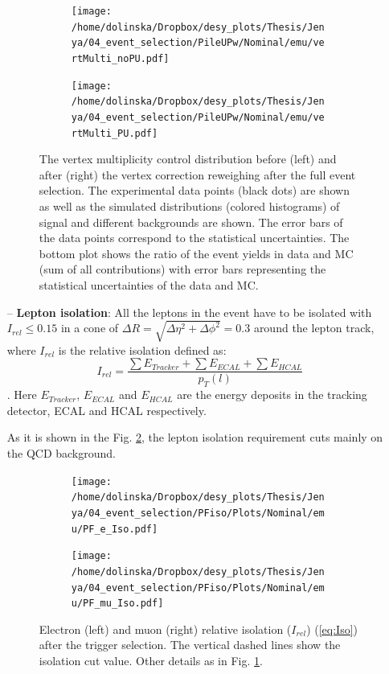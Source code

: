 \begin{itemize}
 \begin{figure}[h]
 \centering
 \begin{subfigure}
   \centering
   \texttt{[image: /home/dolinska/Dropbox/desy\_plots/Thesis/Jenya/04\_event\_selection/PileUPw/Nominal/emu/vertMulti\_noPU.pdf]}
 \end{subfigure}
 \begin{subfigure}
   \centering
   \texttt{[image: /home/dolinska/Dropbox/desy\_plots/Thesis/Jenya/04\_event\_selection/PileUPw/Nominal/emu/vertMulti\_PU.pdf]}
 \end{subfigure}
 \caption{The vertex multiplicity control distribution before (left) and after (right) the vertex correction reweighing after the full event selection.
  The experimental data points (black dots) are shown as well as the simulated distributions (colored histograms) of signal and different backgrounds 
  are shown. The error bars of the data points correspond to the statistical uncertainties. The bottom plot shows the ratio of the event yields in data 
  and MC (sum of all contributions) with error bars representing the statistical uncertainties of the data and MC.}
 \label{fig:PUweight}
 \end{figure}
 
 \item [--] \textbf{Lepton isolation}: All the leptons in the event have to be isolated with $I_{rel}\leq 0.15$ in a cone of $\Delta R = \sqrt{\Delta\eta^{2} + \Delta\phi^{2}} = 0.3$ 
 around the lepton track, where $I_{rel}$ is the relative isolation defined as:
  \begin{equation}\label{eq:Iso}
   I_{rel} = \frac{\sum E_{Tracker} + \sum E_{ECAL} + \sum E_{HCAL}}{p_{T}(l)}
  \end{equation}.
 Here $E_{Tracker}$, $E_{ECAL}$ and $E_{HCAL}$ are the energy deposits in the tracking detector, ECAL and HCAL respectively.
 
 As it is shown in the Fig. \ref{fig:PFIso}, the lepton isolation requirement cuts mainly on the QCD background.

 \begin{figure}[h]
 \centering
 \begin{subfigure}
   \centering
   \texttt{[image: /home/dolinska/Dropbox/desy\_plots/Thesis/Jenya/04\_event\_selection/PFiso/Plots/Nominal/emu/PF\_e\_Iso.pdf]}
 \end{subfigure}
 \begin{subfigure}
   \centering
   \texttt{[image: /home/dolinska/Dropbox/desy\_plots/Thesis/Jenya/04\_event\_selection/PFiso/Plots/Nominal/emu/PF\_mu\_Iso.pdf]}
 \end{subfigure}
 \caption{Electron (left) and muon (right) relative isolation ($I_{rel}$) (\ref{eq:Iso}) after the trigger selection. The vertical dashed lines 
  show the isolation cut value. Other details as in Fig. \ref{fig:PUweight}.}
 \label{fig:PFIso}
 \end{figure}
 

\end{itemize}
